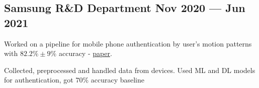 \subsection{Samsung R\&D Department \hfill Nov 2020 --- Jun 2021}
\begin{zitemize}
\item[$\rightarrow$] Worked on a pipeline for mobile phone authentication by user's motion patterns with $82.2\% \pm 9\%$ accuracy - \href{https://arxiv.org/abs/2302.01751}{paper}.
\item Collected, preprocessed and handled data from devices. Used ML and DL models for authentication, got $70\%$ accuracy baseline
\end{zitemize}

